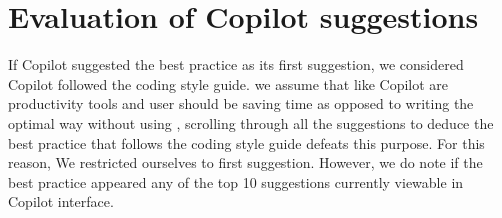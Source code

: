 \section{Evaluation of Copilot suggestions}
\label{smells:evaluation}
If Copilot suggested the best practice as its first suggestion, we considered Copilot followed the coding style guide. we assume that \cct{} like Copilot are productivity tools and user should be saving time as opposed to writing the optimal way without using \cct{}, scrolling through all the suggestions to deduce the best practice that follows the coding style guide defeats this purpose. 
For this reason, We restricted ourselves to first suggestion. However, we do note if the best practice appeared any of the top 10 suggestions currently viewable in Copilot interface. 
